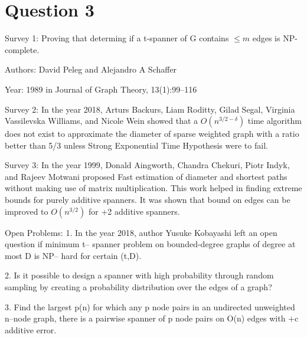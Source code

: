 \documentclass[12pt]{article}
\begin{document}
\section{Question 3}

Survey 1: Proving that determing if a t-spanner of G contains
$\le m$ edges is NP-complete.

Authors: David Peleg and Alejandro A Schaffer   

Year: 1989 in Journal of Graph Theory, 13(1):99–116    

Survey 2: In the year 2018, Arturs Backurs, Liam Roditty, Gilad Segal, Virginia Vassilevska Williams,
and Nicole Wein showed that a $O(n^{3/2-\delta})$ time algorithm
does not exist to approximate the diameter of sparse 
weighted graph with a ratio better than 5/3 unless  Strong Exponential Time Hypothesis
were to fail. 

Survey 3: In the year 1999, 
Donald Aingworth, Chandra Chekuri, Piotr Indyk, and Rajeev Motwani 
proposed  Fast
estimation of diameter and shortest paths
without making use of matrix multiplication. This work
helped in finding extreme bounds for purely 
additive spanners. It was shown
that bound on edges can be improved to $O(n^{3/2})$ for +2
additive spanners.

Open Problems:
1. In the year 2018, author Yusuke Kobayashi left an open 
question if minimum t–
spanner problem on bounded-degree graphs of degree at most D is NP–
hard for certain (t,D).

2. Is it possible to design a spanner with high probability
through random sampling by creating a probability distribution
over the edges of a graph?

3. Find the largest p(n) for which any p node pairs
in an undirected unweighted n–node graph, there is a pairwise spanner of 
p node pairs on O(n) edges with +c additive error.
\end{document}

